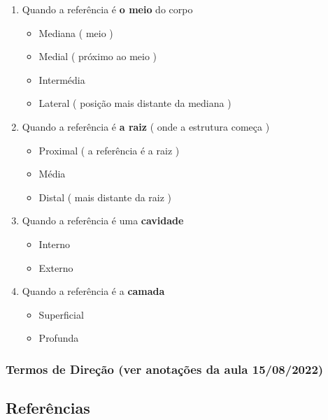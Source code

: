 \documentclass[
]{book}
\providecommand{\tightlist}{%
  \setlength{\itemsep}{0pt}\setlength{\parskip}{0pt}}
\begin{document}
\begin{enumerate}
\def\labelenumi{\arabic{enumi}.}
\tightlist
\item
  Quando a referência é \textbf{o meio} do corpo

  \begin{itemize}
  \tightlist
  \item
    Mediana ( meio )
  \item
    Medial ( próximo ao meio )
  \item
    Intermédia
  \item
    Lateral ( posição mais distante da mediana )
  \end{itemize}
\item
  Quando a referência é \textbf{a raiz} ( onde a estrutura começa )

  \begin{itemize}
  \tightlist
  \item
    Proximal ( a referência é a raiz )
  \item
    Média
  \item
    Distal ( mais distante da raiz )
  \end{itemize}
\item
  Quando a referência é uma \textbf{cavidade}

  \begin{itemize}
  \tightlist
  \item
    Interno
  \item
    Externo
  \end{itemize}
\item
  Quando a referência é a \textbf{camada}

  \begin{itemize}
  \tightlist
  \item
    Superficial
  \item
    Profunda
  \end{itemize}
\end{enumerate}

\hypertarget{termos-de-direuxe7uxe3o-ver-anotauxe7uxf5es-da-aula-15082022}{%
\subsubsection{Termos de Direção (ver anotações da aula 15/08/2022)}\label{termos-de-direuxe7uxe3o-ver-anotauxe7uxf5es-da-aula-15082022}}

\hypertarget{referuxeancias}{%
\subsection{Referências}\label{referuxeancias}}
\end{document}
